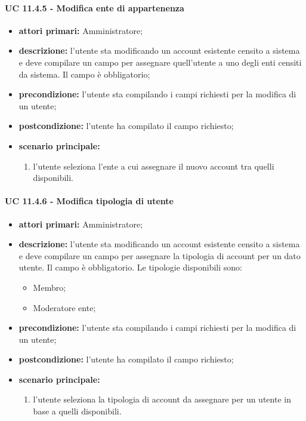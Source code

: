 				\paragraph{UC 11.4.5 - Modifica ente di appartenenza}
				\begin{itemize}
					\item \textbf{attori primari:} Amministratore;
					\item \textbf{descrizione:} l'utente sta modificando un account esistente censito a sistema e deve compilare un campo per assegnare quell'utente a uno degli enti censiti da sistema. Il campo è obbligatorio;
					\item \textbf{precondizione:} l'utente sta compilando i campi richiesti per la modifica di un utente;
					\item \textbf{postcondizione:} l'utente ha compilato il campo richiesto;
					\item \textbf{scenario principale:}
					\begin{enumerate}
						\item{l'utente seleziona l'ente a cui assegnare il nuovo account tra quelli disponibili.}
					\end{enumerate}	
				\end{itemize}

				\paragraph{UC 11.4.6 - Modifica tipologia di utente}
				\begin{itemize}
					\item \textbf{attori primari:} Amministratore;
					\item \textbf{descrizione:} l'utente sta modificando un account esistente censito a sistema e deve compilare un campo per assegnare la tipologia di account per un dato utente. Il campo è obbligatorio. Le tipologie disponibili sono:
					\begin{itemize}
						\item Membro;
						\item Moderatore ente;
					\end{itemize}
					\item \textbf{precondizione:} l'utente sta compilando i campi richiesti per la modifica di un utente;
					\item \textbf{postcondizione:} l'utente ha compilato il campo richiesto;
					\item \textbf{scenario principale:}
					\begin{enumerate}
						\item{l'utente seleziona la tipologia di account da assegnare per un utente in base a quelli disponibili.}
					\end{enumerate}	
				\end{itemize}

